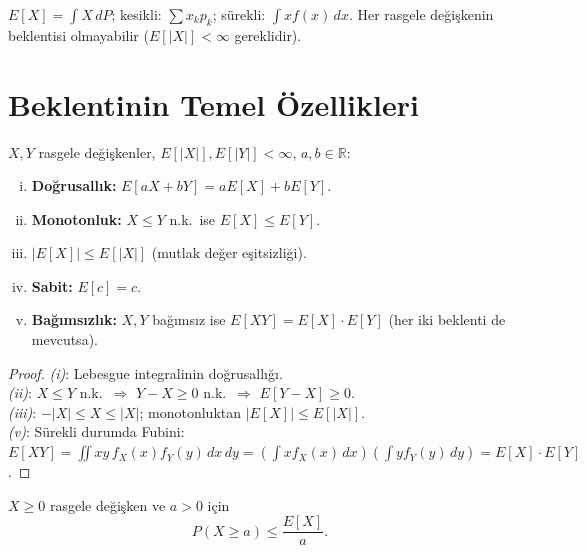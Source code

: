 \begin{mikroozet}
$E[X] = \int X \, dP$; kesikli: $\sum x_k p_k$; sürekli: $\int x f(x) \, dx$.
Her rasgele değişkenin beklentisi olmayabilir ($E[|X|] < \infty$ gereklidir).
\end{mikroozet}

\section{Beklentinin Temel Özellikleri}
\label{sec:beklenti_ozellik}

\begin{teorem}
\label{thm:beklenti_ozellik}
$X, Y$ rasgele değişkenler, $E[|X|], E[|Y|] < \infty$, $a, b \in \mathbb{R}$:
\begin{enumerate}[(i)]
  \item \textbf{Doğrusallık:} $E[aX + bY] = aE[X] + bE[Y]$.
  \item \textbf{Monotonluk:} $X \leq Y$ n.k.\ ise $E[X] \leq E[Y]$.
  \item \textbf{$|E[X]| \leq E[|X|]$} (mutlak değer eşitsizliği).
  \item \textbf{Sabit:} $E[c] = c$.
  \item \textbf{Bağımsızlık:} $X, Y$ bağımsız ise $E[XY] = E[X] \cdot E[Y]$
        (her iki beklenti de mevcutsa).
\end{enumerate}
\end{teorem}

\begin{proof}
\textit{(i)}: Lebesgue integralinin doğrusallığı.\\
\textit{(ii)}: $X \leq Y$ n.k.\ $\Rightarrow$ $Y - X \geq 0$ n.k.\ $\Rightarrow$ $E[Y-X] \geq 0$.\\
\textit{(iii)}: $-|X| \leq X \leq |X|$; monotonluktan $|E[X]| \leq E[|X|]$.\\
\textit{(v)}: Sürekli durumda Fubini:
$E[XY] = \iint xy \, f_X(x) f_Y(y) \, dx \, dy = \left(\int x f_X(x) \, dx\right)\!\left(\int y f_Y(y) \, dy\right)
= E[X] \cdot E[Y]$.
\end{proof}

\begin{teorem}
\label{thm:markov}
$X \geq 0$ rasgele değişken ve $a > 0$ için
\[
  P(X \geq a) \leq \frac{E[X]}{a}.
\]
\end{teorem}

